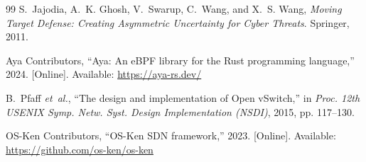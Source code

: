 \documentclass[conference]{IEEEtran}
\begin{document}
\begin{thebibliography}{99}
S.~Jajodia, A.~K. Ghosh, V.~Swarup, C.~Wang, and X.~S. Wang, \emph{Moving Target Defense: Creating Asymmetric Uncertainty for Cyber Threats}. Springer, 2011.

Aya Contributors, ``Aya: An eBPF library for the Rust programming language,'' 2024. [Online]. Available: \url{https://aya-rs.dev/}

B.~Pfaff \emph{et~al.}, ``The design and implementation of Open vSwitch,'' in \emph{Proc. 12th USENIX Symp. Netw. Syst. Design Implementation (NSDI)}, 2015, pp. 117--130.

OS-Ken Contributors, ``OS-Ken SDN framework,'' 2023. [Online]. Available: \url{https://github.com/os-ken/os-ken}

\end{thebibliography}
\end{document}
